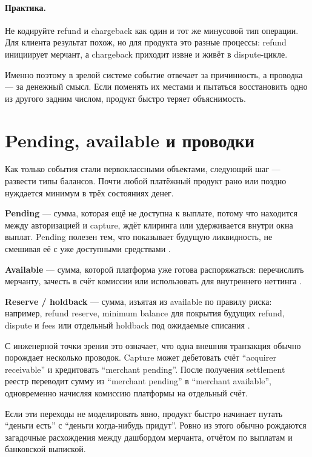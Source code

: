 \paragraph{Практика.}
Не кодируйте refund и chargeback как один и тот же минусовой тип операции. Для клиента результат похож, но для продукта это разные процессы: refund инициирует мерчант, а chargeback приходит извне и живёт в dispute-цикле.


Именно поэтому в зрелой системе событие отвечает за причинность,
а проводка — за денежный смысл. Если поменять их местами и пытаться
восстановить одно из другого задним числом, продукт быстро теряет
объяснимость.

\section{Pending, available и проводки}
\label{sec:ledger-balances}

Как только события стали первоклассными объектами, следующий шаг —
развести типы балансов. Почти любой платёжный продукт рано или поздно
нуждается минимум в трёх состояниях денег.

\textbf{Pending} — сумма, которая ещё не доступна к выплате,
потому что находится между авторизацией и capture, ждёт клиринга
или удерживается внутри окна выплат. Pending полезен тем, что
показывает будущую ликвидность, не смешивая её с уже доступными
средствами \cite{stripe-balances,adyen-balances}.

\textbf{Available} — сумма, которой платформа уже готова
распоряжаться: перечислить мерчанту, зачесть в счёт комиссии
или использовать для внутреннего неттинга \cite{stripe-balances}.

\textbf{Reserve / holdback} — сумма, изъятая из available
по правилу риска: например, refund reserve, minimum balance для покрытия
будущих refund, dispute и fees или отдельный holdback под ожидаемые
списания \cite{stripe-balances,stripe-minimum-balances,adyen-balances}.

С инженерной точки зрения это означает, что одна внешняя транзакция
обычно порождает несколько проводок. Capture может дебетовать
счёт \enquote{acquirer receivable} и кредитовать \enquote{merchant pending}.
После получения settlement реестр переводит сумму из
\enquote{merchant pending} в \enquote{merchant available},
одновременно начисляя комиссию платформы на отдельный счёт.

Если эти переходы не моделировать явно, продукт быстро начинает
путать \enquote{деньги есть} с \enquote{деньги когда-нибудь придут}.
Ровно из этого обычно рождаются загадочные расхождения между
дашбордом мерчанта, отчётом по выплатам и банковской выпиской.

